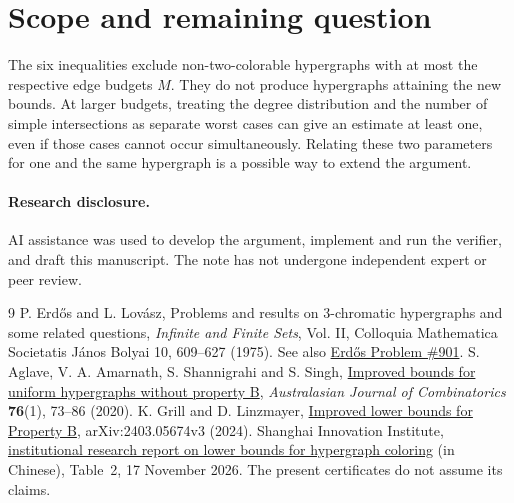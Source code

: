 \documentclass[11pt,a4paper]{article}
\begin{document}
\section*{Scope and remaining question}
The six inequalities exclude non-two-colorable hypergraphs with at most the respective edge budgets $M$. They do not produce hypergraphs attaining the new bounds. At larger budgets, treating the degree distribution and the number of simple intersections as separate worst cases can give an estimate at least one, even if those cases cannot occur simultaneously. Relating these two parameters for one and the same hypergraph is a possible way to extend the argument.
\paragraph{Research disclosure.} AI assistance was used to develop the argument, implement and run the verifier, and draft this manuscript. The note has not undergone independent expert or peer review.
\begin{thebibliography}{9}
 P. Erd\H os and L. Lov\'asz, Problems and results on 3-chromatic hypergraphs and some related questions, \emph{Infinite and Finite Sets}, Vol. II, Colloquia Mathematica Societatis J\'anos Bolyai 10, 609--627 (1975). See also \href{https://www.erdosproblems.com/forum/thread/901}{Erd\H os Problem \#901}.
 S. Aglave, V. A. Amarnath, S. Shannigrahi and S. Singh, \href{https://ajc.maths.uq.edu.au/pdf/76/ajc_v76_p073.pdf}{Improved bounds for uniform hypergraphs without property B}, \emph{Australasian Journal of Combinatorics} \textbf{76}(1), 73--86 (2020).
 K. Grill and D. Linzmayer, \href{https://arxiv.org/abs/2403.05674}{Improved lower bounds for Property B}, arXiv:2403.05674v3 (2024).
 Shanghai Innovation Institute, \href{https://www.sii.edu.cn/2026/1113/c27a1357/page.htm}{institutional research report on lower bounds for hypergraph coloring} (in Chinese), Table~2, 17 November 2026. The present certificates do not assume its claims.
\end{thebibliography}
\end{document}
